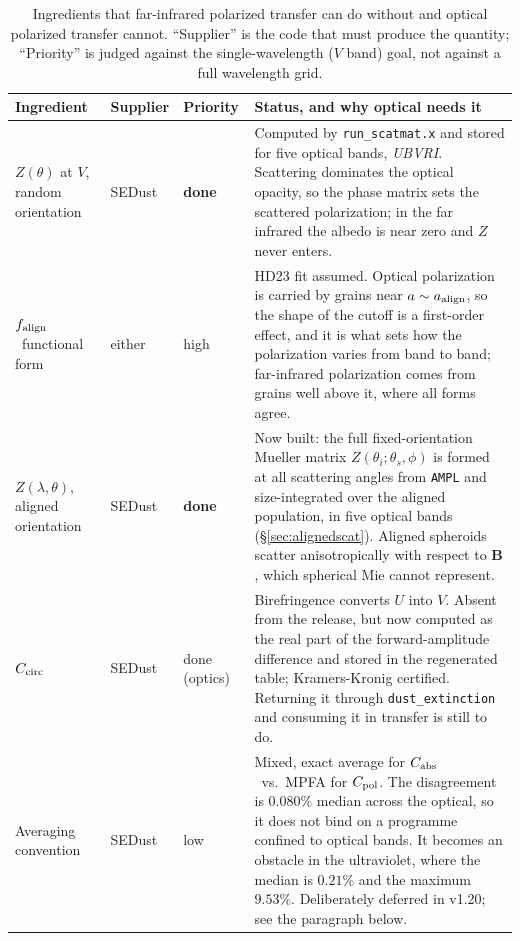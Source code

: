 \documentclass{my_memo}
\let\mathbf\boldsymbol
\newcommand{\code}[1]{\texttt{#1}}
\newcommand{\Cabs}{\ensuremath{C_{\rm abs}}}
\newcommand{\Cpol}{\ensuremath{C_{\rm pol}}}
\newcommand{\Ccirc}{\ensuremath{C_{\rm circ}}}
\newcommand{\aalign}{\ensuremath{a_{\rm align}}}
\newcommand{\falign}{\ensuremath{f_{\rm align}}}
\begin{document}
\begin{table}[!ht]
\centering
\caption{Ingredients that far-infrared polarized transfer can do
without and optical polarized transfer cannot. ``Supplier'' is the code
that must produce the quantity; ``Priority'' is judged against the
single-wavelength ($V$ band) goal, not against a full wavelength grid.}
\label{tab:optical}
\begin{tabularx}{\textwidth}{l l l X}
\toprule
Ingredient & Supplier & Priority & Status, and why optical needs it \\
\midrule
$Z(\theta)$ at $V$, random orientation &
  SEDust & \textbf{done} &
  Computed by \code{run\_scatmat.x} and stored for five optical bands,
  \textit{UBVRI}. Scattering dominates the optical opacity, so the phase matrix
  sets the scattered polarization; in the far infrared the albedo is
  near zero and $Z$ never enters. \\
\falign\ functional form &
  either & high &
  HD23 fit assumed. Optical polarization is carried by grains near
  $a \sim \aalign$, so the shape of the cutoff is a first-order effect,
  and it is what sets how the polarization varies from band to band;
  far-infrared polarization comes from grains well above it, where all
  forms agree. \\
$Z(\lambda,\theta)$, aligned orientation &
  SEDust & \textbf{done} &
  Now built: the full fixed-orientation Mueller matrix
  $Z(\theta_i;\theta_s,\phi)$ is formed at all scattering angles from
  \code{AMPL} and size-integrated over the aligned population,
  in five optical bands (\S\ref{sec:alignedscat}). Aligned spheroids scatter
  anisotropically with respect to $\mathbf{B}$, which spherical Mie cannot
  represent. \\
\Ccirc &
  SEDust & done (optics) &
  Birefringence converts $U$ into $V$. Absent from the release, but now
  computed as the real part of the forward-amplitude difference and stored
  in the regenerated table; Kramers-Kronig certified. Returning it through
  \code{dust\_extinction} and consuming it in transfer is still to do. \\
Averaging convention &
  SEDust & low &
  Mixed, exact average for \Cabs\ vs.\ MPFA for \Cpol. The disagreement
  is $0.080\%$ median across the optical, so it does not bind on a
  programme confined to optical bands. It becomes an obstacle in the
  ultraviolet, where the median is $0.21\%$ and the maximum $9.53\%$.
  Deliberately deferred in v1.20; see the paragraph below. \\
\bottomrule
\end{tabularx}
\end{table}
\end{document}
